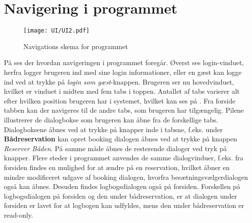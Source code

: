 \section{Navigering i programmet}
\begin{figure}[H]
\texttt{[image: UI/UI2.pdf]}
\label{img:programNavigation}
\vspace{-310pt}
\caption{Navigations skema for programmet}
\vspace{-20pt}
\end{figure}
På  ses der hvordan navigeringen i programmet foregår.
Øverst ses login-vinduet, herfra logger brugeren ind med sine login informationer, eller en gæst kan logge ind ved at trykke på \textit{login som gæst}-knappen.
Brugeren ser nu hovedvinduet, hvilket er vinduet i midten med fem tabs i toppen.
Antallet af tabs varierer alt efter hvilken position brugeren har i systemet, hvilket kan ses på . 
Fra forside tabben kan der navigeres til de andre tabs, som brugeren har tilgængelig.
Pilene illustrerer de dialogbokse som brugeren kan åbne fra de forskellige tabs.
Dialogboksene åbnes ved at trykke på knapper inde i tabsne, f.eks. under  \textbf{Bådreservation} kan opret booking dialogen åbnes ved at trykke på knappen \textit{Reserver Båden}. 
På samme måde åbnes de resterende dialoger ved tryk på knapper.
Flere steder i programmet anvendes de samme dialogvinduer, f.eks. fra forsiden findes en mulighed for at ændre på en reservation, hvilket åbner en mindre modificeret udgave af booking dialogen, hvorfra besætningsvælgerdialogen også kan åbnes.
Desuden findes logbogsdialogen også på forsiden.
Forskellen på logbogsdialogen på forsiden og den under bådreservation, er at dialogen under forsiden er lavet for at logbogen kan udfyldes, mens den under bådreservation er read-only.
